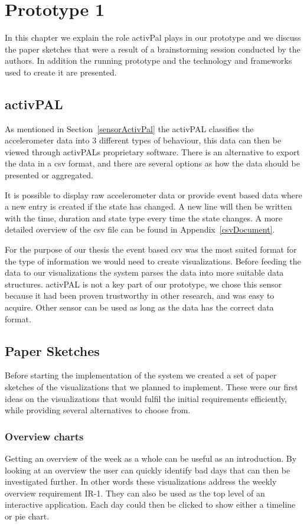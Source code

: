 \chapter{Prototype 1}
\label{ch:prototype1}
In this chapter we explain the role activPal plays in our prototype and we discuss the paper sketches that were a result of a brainstorming session conducted by the authors. In addition the running prototype and the technology and frameworks used to create it are presented.

\section{activPAL}
As mentioned in Section~\ref{sensorActivPal} the activPAL classifies the accelerometer data into 3 different types of behaviour, this data can then be viewed through activPALs proprietary software. There is an alternative to export the data in a \gls{csv} format, and there are several options as how the data should be presented or aggregated. 

It is possible to display raw accelerometer data or provide event based data where a new entry is created if the state has changed. A new line will then be written with the time, duration and state type every time the state changes. A more detailed overview of the \gls{csv} file can be found in Appendix~\ref{csvDocument}.

For the purpose of our thesis the event based \gls{csv} was the most suited format for the type of information we would need to create visualizations. Before feeding the data to our visualizations the system parses the data into more suitable data structures. activPAL is not a key part of our prototype, we chose this sensor because it had been proven trustworthy in other research, and was easy to acquire. Other sensor can be used as long as the data has the correct data format.

\section{Paper Sketches}
\label{sec:paperSketches}
Before starting the implementation of the system we created a set of paper sketches of the visualizations that we planned to implement. These were our first ideas on the visualizations that would fulfil the initial requirements efficiently, while providing several alternatives to choose from.

\subsection{Overview charts}
Getting an overview of the week as a whole can be useful as an introduction. By looking at an overview the user can quickly identify bad days that can then be investigated further. In other words these visualizations address the weekly overview requirement IR-1. They can also be used as the top level of an interactive application. Each day could then be clicked to show either a timeline or pie chart.

